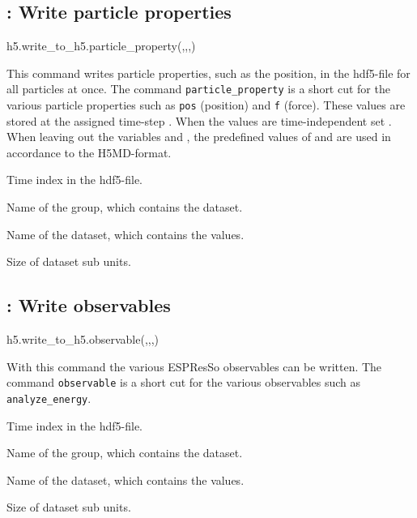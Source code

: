 \subsection{: Write particle properties}
\begin{pyessyntax}
h5.write_to_h5.particle_property(,,,)
\end{pyessyntax}
This command writes particle properties, such as the position, in the hdf5-file for all particles at once. The command \mbox{\texttt{particle_property}} is a short cut for the various particle properties such as \texttt{pos} (position) and \texttt{f} (force). These values are stored at the assigned time-step . When the values are time-independent set . When leaving out the variables  and , the predefined values of  and  are used in accordance to the H5MD-format.
\begin{arguments}
\item[\var{timestep}] Time index in the hdf5-file.
\item[\var{groupname}] Name of the group, which contains the dataset.
\item[\var{datasetname}] Name of the dataset, which contains the values.
\item[\var{chunks}] Size of dataset sub units. 
\end{arguments}

\subsection{: Write observables}
\begin{pyessyntax}
h5.write_to_h5.observable(,,,)
\end{pyessyntax}
With this command the various ESPResSo observables can be written. The command \texttt{observable} is a short cut for the various observables such as \texttt{analyze_energy}.
\begin{arguments}
\item[\var{timestep}] Time index in the hdf5-file.
\item[\var{groupname}] Name of the group, which contains the dataset.
\item[\var{datasetname}] Name of the dataset, which contains the values.
\item[\var{chunks}] Size of dataset sub units.
\end{arguments}

